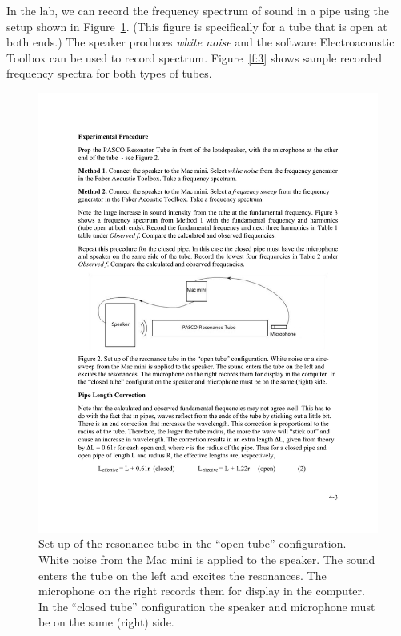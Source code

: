 \documentclass[11pt]{NSF}
\begin{document}
In the lab, we can record the frequency spectrum of sound in a pipe
using the setup shown in Figure~\ref{f:2}.
(This figure is specifically for a tube that is open at both ends.)
The speaker produces {\em white noise} and the software 
Electroacoustic Toolbox can be used to record spectrum.
Figure~\ref{f:3} shows sample recorded frequency spectra for both 
types of tubes.
%
\begin{figure}[hbtp]
\begin{center}
\includegraphics[width=.65\textwidth]{fig4_2}
\caption{Set up of the resonance tube in the ``open tube” configuration. White
noise from the Mac mini is applied to the speaker. The sound
enters the tube on the left and excites the resonances. The microphone on the
right records them for display in the computer. In the ``closed tube” 
configuration the speaker and microphone must be on the same (right) side.}
\label{f:2} 
\end{center} 
\end{figure}
%
%
\end{document}
